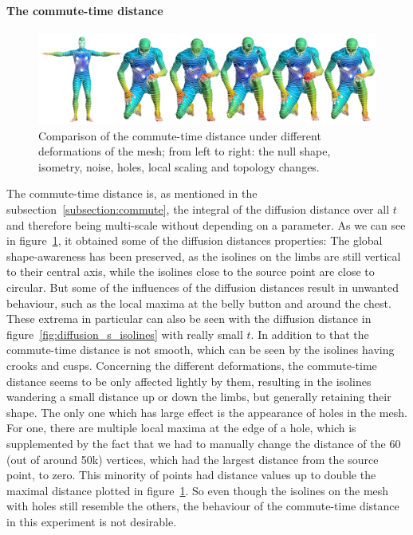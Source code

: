 \paragraph{The commute-time distance}
\begin{figure}[h]
	\centering
	\includegraphics[width = \textwidth]{../results/commute_time_isolines}
	\caption{Comparison of the commute-time distance under different deformations of the mesh; from left to right: the null shape, isometry, noise, holes, local scaling and topology changes.}
	\label{fig:commute_time_isolines}
\end{figure}
The commute-time distance is, as mentioned in the subsection~\ref{subsection:commute}, the integral of the diffusion distance  over all $t$ and therefore being multi-scale without depending on a parameter.
As we can see in figure~\ref{fig:commute_time_isolines}, it obtained some of the diffusion distances properties:
The global shape-awareness has been preserved, as the isolines on the limbs are still vertical to their central axis, while the isolines close to the source point are close to circular.
But some of the influences of the diffusion distances result in unwanted behaviour, such as the local maxima at the belly button and around the chest.
These extrema in particular can also be seen with the diffusion distance in figure~\ref{fig:diffusion_s_isolines} with really small $t$.
In addition to that the commute-time distance is not smooth, which can be seen by the isolines having crooks and cusps.
Concerning the different deformations, the commute-time distance seems to be only affected lightly by them, resulting in the isolines wandering a small distance up or down the limbs, but generally retaining their shape.
The only one which has large effect is the appearance of holes in the mesh.
For one, there are multiple local maxima at the edge of a hole, which is supplemented by the fact that we had to manually change the distance of the 60 (out of around 50k) vertices, which had the largest distance from the source point, to zero.
This minority of points had distance values up to double the maximal distance plotted in figure~\ref{fig:commute_time_isolines}.
So even though the isolines on the mesh with holes still resemble the others, the behaviour of the commute-time distance in this experiment is not desirable.

